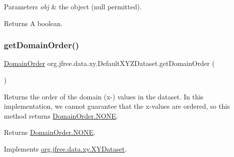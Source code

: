 \begin{DoxyParams}{Parameters}
{\em obj} & the object ({\ttfamily null} permitted).\\
\hline
\end{DoxyParams}
\begin{DoxyReturn}{Returns}
A boolean. 
\end{DoxyReturn}
\mbox{\label{classorg_1_1jfree_1_1data_1_1xy_1_1_default_x_y_z_dataset_a9e4e89eafc3996ec5c9fd10f6d3891a4}} 
\subsubsection{\texorpdfstring{get\+Domain\+Order()}{getDomainOrder()}}
{\footnotesize\ttfamily \mbox{\hyperlink{classorg_1_1jfree_1_1data_1_1_domain_order}{Domain\+Order}} org.\+jfree.\+data.\+xy.\+Default\+X\+Y\+Z\+Dataset.\+get\+Domain\+Order (\begin{DoxyParamCaption}{ }\end{DoxyParamCaption})}

Returns the order of the domain (x-\/) values in the dataset. In this implementation, we cannot guarantee that the x-\/values are ordered, so this method returns {\ttfamily \mbox{\hyperlink{classorg_1_1jfree_1_1data_1_1_domain_order_a3e1bac41a165ed944192559f61ac6c20}{Domain\+Order.\+N\+O\+NE}}}.

\begin{DoxyReturn}{Returns}
{\ttfamily \mbox{\hyperlink{classorg_1_1jfree_1_1data_1_1_domain_order_a3e1bac41a165ed944192559f61ac6c20}{Domain\+Order.\+N\+O\+NE}}}. 
\end{DoxyReturn}


Implements \mbox{\hyperlink{interfaceorg_1_1jfree_1_1data_1_1xy_1_1_x_y_dataset_a49306db52a1ea7de951d807d21ab9c7c}{org.\+jfree.\+data.\+xy.\+X\+Y\+Dataset}}.

\mbox{\label{classorg_1_1jfree_1_1data_1_1xy_1_1_default_x_y_z_dataset_ab2b89b3c08d589c6d554ad4656be1dd2}} 
